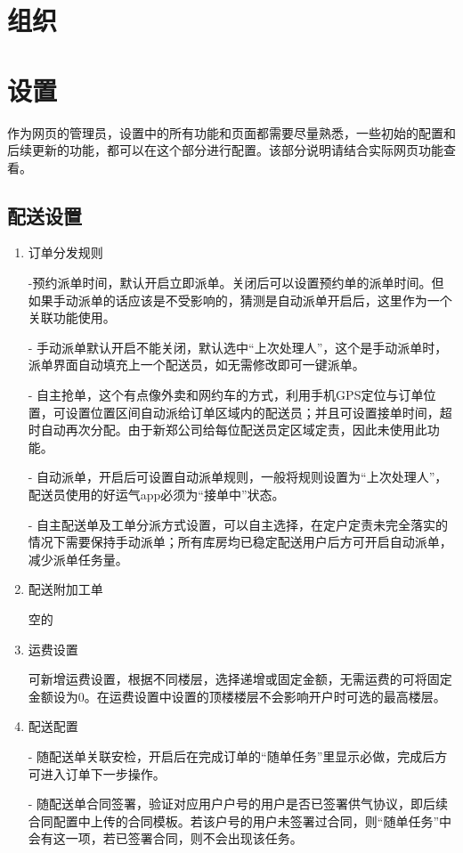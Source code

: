 \documentclass[UTF8]{ctexart}
\begin{document}
\section{组织}



\section{设置}
作为网页的管理员，设置中的所有功能和页面都需要尽量熟悉，一些初始的配置和后续更新的功能，都可以在这个部分进行配置。该部分说明请结合实际网页功能查看。

\subsection{配送设置}

\begin{enumerate}
\item 订单分发规则

-预约派单时间，默认开启立即派单。关闭后可以设置预约单的派单时间。但如果手动派单的话应该是不受影响的，猜测是自动派单开启后，这里作为一个关联功能使用。

- 手动派单默认开启不能关闭，默认选中“上次处理人”，这个是手动派单时，派单界面自动填充上一个配送员，如无需修改即可一键派单。

- 自主抢单，这个有点像外卖和网约车的方式，利用手机GPS定位与订单位置，可设置位置区间自动派给订单区域内的配送员；并且可设置接单时间，超时自动再次分配。由于新郑公司给每位配送员定区域定责，因此未使用此功能。

- 自动派单，开启后可设置自动派单规则，一般将规则设置为“上次处理人”，配送员使用的好运气app必须为“接单中”状态。

- 自主配送单及工单分派方式设置，可以自主选择，在定户定责未完全落实的情况下需要保持手动派单；所有库房均已稳定配送用户后方可开启自动派单，减少派单任务量。

\item 配送附加工单

空的

\item 运费设置

可新增运费设置，根据不同楼层，选择递增或固定金额，无需运费的可将固定金额设为0。在运费设置中设置的顶楼楼层不会影响开户时可选的最高楼层。

\item 配送配置

- 随配送单关联安检，开启后在完成订单的“随单任务”里显示必做，完成后方可进入订单下一步操作。

- 随配送单合同签署，验证对应用户户号的用户是否已签署供气协议，即后续合同配置中上传的合同模板。若该户号的用户未签署过合同，则“随单任务”中会有这一项，若已签署合同，则不会出现该任务。


\end{enumerate}
\end{document}
